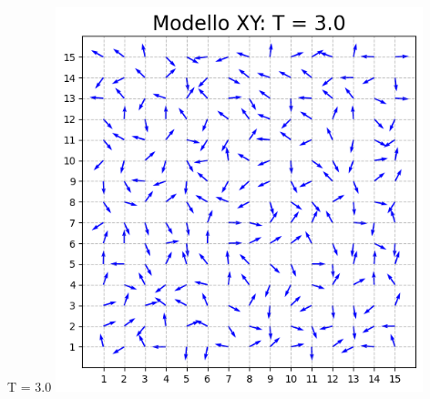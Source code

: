 \begin{frame}
\begin{columns}
\begin{column}{0.5\textwidth}
\begin{block}{T = 3.0}
                \centering
                \includegraphics[width=0.8\textwidth]{Immagini/backupXY/conf_T3.0.png}

            \end{block}
        \end{column}
    \end{columns}

\end{frame}